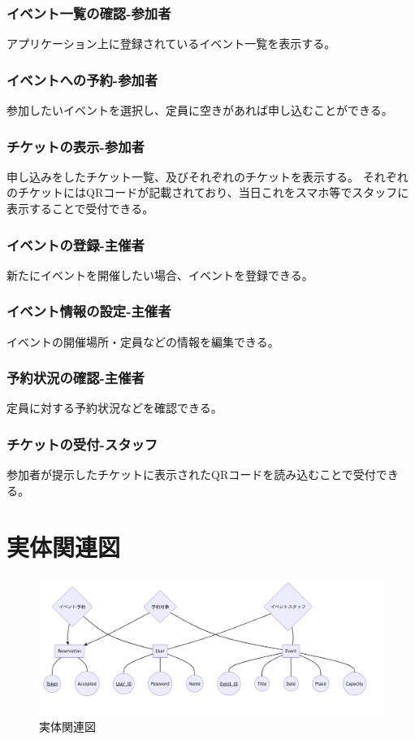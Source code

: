 \documentclass[dvipdfmx]{jarticle}
\begin{document}
\subsubsection{イベント一覧の確認-参加者}
アプリケーション上に登録されているイベント一覧を表示する。
\subsubsection{イベントへの予約-参加者}
参加したいイベントを選択し、定員に空きがあれば申し込むことができる。
\subsubsection{チケットの表示-参加者}
申し込みをしたチケット一覧、及びそれぞれのチケットを表示する。
それぞれのチケットにはQRコードが記載されており、当日これをスマホ等でスタッフに表示することで受付できる。
\subsubsection{イベントの登録-主催者}
新たにイベントを開催したい場合、イベントを登録できる。
\subsubsection{イベント情報の設定-主催者}
イベントの開催場所・定員などの情報を編集できる。
\subsubsection{予約状況の確認-主催者}
定員に対する予約状況などを確認できる。
\subsubsection{チケットの受付-スタッフ}
参加者が提示したチケットに表示されたQRコードを読み込むことで受付できる。


\section{実体関連図}

\begin{figure}[H]
  \centering
  \includegraphics[scale=0.4]{ermodel.png}
  \caption{実体関連図}
\end{figure}
\end{document}
